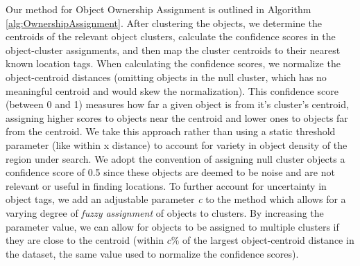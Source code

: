 Our method for Object Ownership Assignment is outlined in Algorithm \ref{alg:OwnershipAssignment}. 
After clustering the objects, we determine the centroids of the relevant object clusters, calculate the confidence scores in the object-cluster assignments, and then map the cluster centroids to their nearest known location tags. 
When calculating the confidence scores, we normalize the object-centroid distances (omitting objects in the null cluster, which has no meaningful centroid and would skew the normalization). 
This confidence score (between 0 and 1) measures how far a given object is from it's cluster's centroid, assigning higher scores to objects near the centroid and lower ones to objects far from the centroid. 
We take this approach rather than using a static threshold parameter (like within x distance) to account for variety in object density of the region under search. 
We adopt the convention of assigning null cluster objects a confidence score of 0.5 since these objects are deemed to be noise and are not relevant or useful in finding locations.
To further account for uncertainty in object tags, we add an adjustable parameter \textit{c} to the method which allows for a varying degree of \textit{fuzzy assignment} of objects to clusters. 
By increasing the parameter value, we can allow for objects to be assigned to multiple clusters if they are close to the centroid (within \textit{$c\%$} of the largest object-centroid distance in the dataset, the same value used to normalize the confidence scores). %
